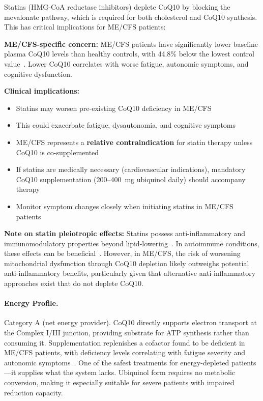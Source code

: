 \begin{warning}
\label{warn:statin-coq10}
Statins (HMG-CoA reductase inhibitors) deplete CoQ10 by blocking the mevalonate pathway, which is required for both cholesterol and CoQ10 synthesis. This has critical implications for ME/CFS patients:

\textbf{ME/CFS-specific concern:} ME/CFS patients have significantly lower baseline plasma CoQ10 levels than healthy controls, with 44.8\% below the lowest control value~\cite{Maes2009CoQ10}. Lower CoQ10 correlates with worse fatigue, autonomic symptoms, and cognitive dysfunction.

\textbf{Clinical implications:}
\begin{itemize}
    \item Statins may worsen pre-existing CoQ10 deficiency in ME/CFS
    \item This could exacerbate fatigue, dysautonomia, and cognitive symptoms
    \item ME/CFS represents a \textbf{relative contraindication} for statin therapy unless CoQ10 is co-supplemented
    \item If statins are medically necessary (cardiovascular indications), mandatory CoQ10 supplementation (200--400~mg ubiquinol daily) should accompany therapy
    \item Monitor symptom changes closely when initiating statins in ME/CFS patients
\end{itemize}

\textbf{Note on statin pleiotropic effects:} Statins possess anti-inflammatory and immunomodulatory properties beyond lipid-lowering~\cite{Blum2004StatinPleio}. In autoimmune conditions, these effects can be beneficial~\cite{McCarey2004StatinRA}. However, in ME/CFS, the risk of worsening mitochondrial dysfunction through CoQ10 depletion likely outweighs potential anti-inflammatory benefits, particularly given that alternative anti-inflammatory approaches exist that do not deplete CoQ10.
\end{warning}

\paragraph{Energy Profile.}
Category A (net energy provider). CoQ10 directly supports electron transport at the Complex I/III junction, providing substrate for ATP synthesis rather than consuming it. Supplementation replenishes a cofactor found to be deficient in ME/CFS patients, with deficiency levels correlating with fatigue severity and autonomic symptoms~\cite{Maes2009CoQ10}. One of the safest treatments for energy-depleted patients---it supplies what the system lacks. Ubiquinol form requires no metabolic conversion, making it especially suitable for severe patients with impaired reduction capacity.


